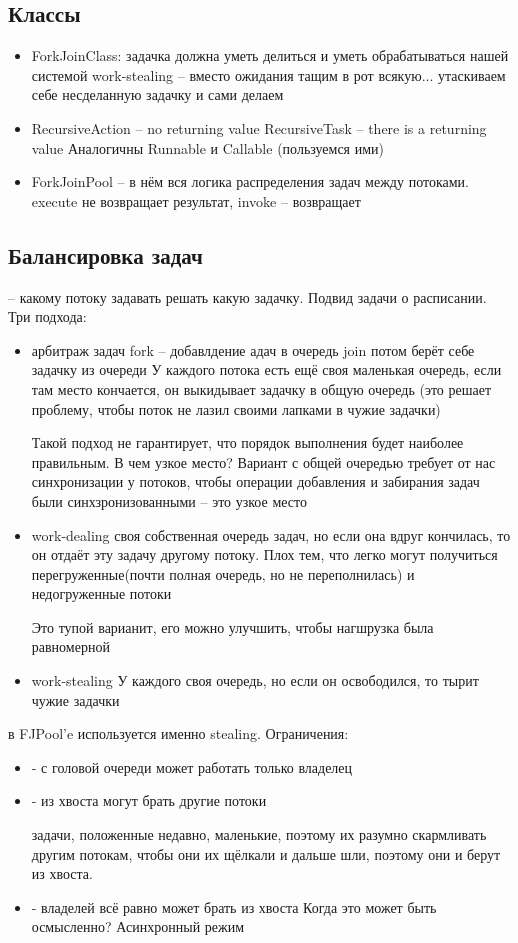 \subsection{Классы}
\begin{itemize}
\item
	ForkJoinClass: задачка должна уметь делиться и уметь обрабатываться нашей системой
	work-stealing -- вместо ожидания тащим в рот всякую... утаскиваем себе несделанную задачку и сами делаем
\item
	RecursiveAction -- no returning value
	RecursiveTask -- there is a returning value
	Аналогичны Runnable и Callable
	(пользуемся ими)
\item
	ForkJoinPool -- в нём вся логика распределения задач между потоками.
	execute не возвращает результат, invoke -- возвращает
\end{itemize}

\subsection{Балансировка задач} -- какому потоку задавать решать какую задачку.
Подвид задачи о расписании.
Три подхода:
\begin{itemize}
\item
	арбитраж задач
	fork -- добавлдение адач в очередь
	join 
	потом берёт себе задачку из очереди
	У каждого потока есть ещё своя маленькая очередь, %
	если там место кончается, он выкидывает задачку в общую очередь	
	(это решает проблему, чтобы поток не лазил своими лапками в чужие задачки)

	Такой подход не гарантирует, что порядок выполнения будет наиболее правильным.
	В чем узкое место? Вариант с общей очередью требует от нас синхронизации у потоков, чтобы операции добавления
	и забирания задач были синхзронизованными -- это узкое место

\item
	work-dealing
	своя собственная очередь задач, но если она вдруг кончилась, то он отдаёт эту задачу другому потоку.
	Плох тем, что легко могут получиться перегруженные(почти полная очередь, но не переполнилась) и недогруженные потоки

	Это тупой варианит, его можно улучшить, чтобы нагшрузка была равномерной

\item
	work-stealing
	У каждого своя очередь, но если он освободился, то тырит чужие задачки
\end{itemize}
в FJPool'e используется именно stealing. 
Ограничения:
\begin{itemize}
\item
- с головой очереди может работать  только владелец
\item
- из хвоста могут брать другие потоки

задачи, положенные недавно, маленькие, поэтому их разумно скармливать другим потокам, 
чтобы они их щёлкали и дальше шли, поэтому они и берут из хвоста.
\item
- владелей всё равно может брать из хвоста
Когда это может быть осмысленно?
Асинхронный режим
\end{itemize}

